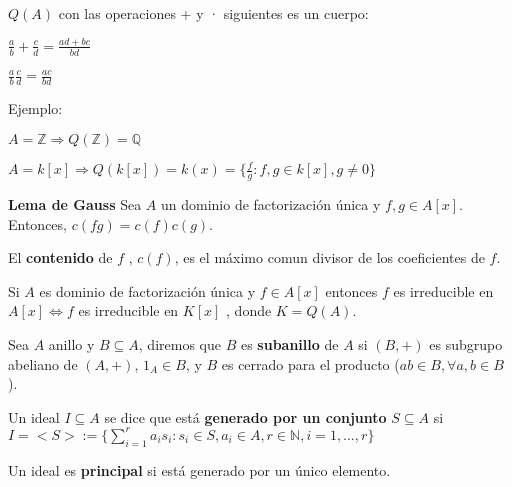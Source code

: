 \begin{Prop}
$Q(A)$ con las operaciones + y · siguientes es un cuerpo:

\begin{itemize*}
\item $\frac{a}{b} + \frac{c}{d}= \frac{ad+bc}{bd}$
\item $\frac{a}{b} \frac{c}{d} = \frac{ac}{bd}$
\end{itemize*}
\end{Prop}
Ejemplo:

\begin{itemize*}
\item $A=\mathbb{Z} \Rightarrow Q(\mathbb{Z})=\mathbb{Q}$
\item $A=k[x] \Rightarrow Q(k[x])=k(x)= \{\frac{f}{g} : f,g\in k[x], g\neq 0  \}$
\end{itemize*}

\begin{Lem}
\textbf{Lema de Gauss} Sea $A$ un dominio de factorización única y $f,g \in A[x]$. Entonces, $c(fg)=c(f)c(g)$.
\end{Lem}


\begin{Def}
El \textbf{contenido} de $f$ , $c(f)$, es el máximo comun divisor de los coeficientes de $f$.
\end{Def}

\begin{Cor}
Si $A$ es dominio de factorización única y $f\in A[x]$ entonces $f$ es irreducible en $A[x] \Leftrightarrow f$ es irreducible en $K[x]$ , donde $K=Q(A)$.
\end{Cor}

\begin{Def}
Sea $A$ anillo y $B\subseteq A$, diremos que $B$ es \textbf{subanillo} de $A$ si $(B,+)$ es subgrupo abeliano de $(A,+)$,
$1_A \in B$, y $B$ es cerrado para el producto ($ab\in B, \forall a,b\in B$).
\end{Def}


\begin{Def}
Un ideal $I\subseteq A$ se dice que está \textbf{generado por un conjunto} 
$ S \subseteq A$ si $I = <S> := \{ \sum_{i=1}^{r}a_is_i : s_i \in S, a_i  \in A, r\in \mathbb{N},i=1,\dots , r \} $
\end{Def}

\begin{Def}
Un ideal es \textbf{principal} si está generado por un único elemento.
\end{Def}


